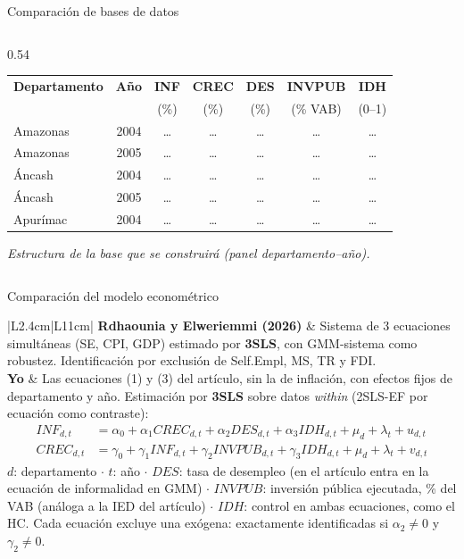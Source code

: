 \documentclass[serif, aspectratio=169]{beamer}
\begin{document}
\begin{frame}{Comparación de bases de datos}
\begin{columns}[T]
\begin{column}{0.54\textwidth}
\vspace{4pt}
\centering
{\scriptsize\setlength{\tabcolsep}{2pt}
\begin{tabular}{lcccccc}
\toprule
\textbf{Departamento} & \textbf{Año} & \textbf{INF} & \textbf{CREC} & \textbf{DES} & \textbf{INVPUB} & \textbf{IDH} \\
 & & (\%) & (\%) & (\%) & (\% VAB) & (0--1) \\
\midrule
Amazonas & 2004 & \ldots & \ldots & \ldots & \ldots & \ldots \\
Amazonas & 2005 & \ldots & \ldots & \ldots & \ldots & \ldots \\
Áncash & 2004 & \ldots & \ldots & \ldots & \ldots & \ldots \\
Áncash & 2005 & \ldots & \ldots & \ldots & \ldots & \ldots \\
Apurímac & 2004 & \ldots & \ldots & \ldots & \ldots & \ldots \\
\bottomrule
\end{tabular}}

\vspace{2pt}
\raggedright
{\tiny\itshape Estructura de la base que se construirá (panel departamento--año).}
\end{column}
\end{columns}
\end{frame}

\begin{frame}{Comparación del modelo econométrico}
\footnotesize
\renewcommand{\arraystretch}{1.4}
\begin{tabular}{|L{2.4cm}|L{11cm}|}
\hline
\textbf{Rdhaounia y Elweriemmi (2026)} &
Sistema de 3 ecuaciones simultáneas (SE, CPI, GDP) estimado por \textbf{3SLS}, con GMM-sistema como robustez. Identificación por exclusión de Self.Empl, MS, TR y FDI. \\
\hline
\textbf{Yo} &
Las ecuaciones (1) y (3) del artículo, sin la de inflación, con efectos fijos de departamento y año. Estimación por \textbf{3SLS} sobre datos \textit{within} (2SLS-EF por ecuación como contraste):
\[
\begin{aligned}
INF_{d,t} &= \alpha_0 + \alpha_1 CREC_{d,t} + \alpha_2 DES_{d,t} + \alpha_3 IDH_{d,t} + \mu_d + \lambda_t + u_{d,t}\\
CREC_{d,t} &= \gamma_0 + \gamma_1 INF_{d,t} + \gamma_2 INVPUB_{d,t} + \gamma_3 IDH_{d,t} + \mu_d + \lambda_t + v_{d,t}
\end{aligned}
\]
{\scriptsize $d$: departamento $\cdot$ $t$: año $\cdot$ $DES$: tasa de desempleo (en el artículo entra en la ecuación de informalidad en GMM) $\cdot$ $INVPUB$: inversión pública ejecutada, \% del VAB (análoga a la IED del artículo) $\cdot$ $IDH$: control en ambas ecuaciones, como el HC. Cada ecuación excluye una exógena: exactamente identificadas si $\alpha_2 \neq 0$ y $\gamma_2 \neq 0$.} \\
\hline
\end{tabular}
\end{frame}
\end{document}
